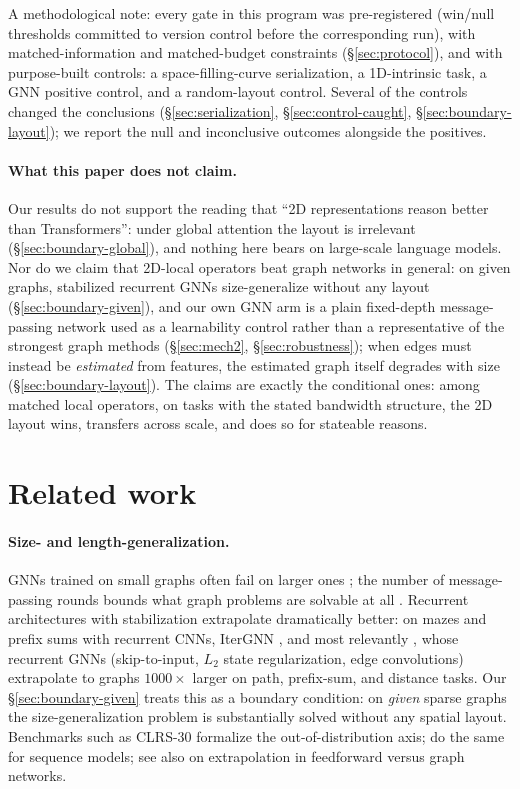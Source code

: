 \documentclass[11pt]{article}
\begin{document}
A methodological note: every gate in this program was pre-registered (win/null
thresholds committed to version control before the corresponding run), with
matched-information and matched-budget constraints (\S\ref{sec:protocol}), and
with purpose-built controls: a space-filling-curve serialization, a
1D-intrinsic task, a GNN positive control, and a random-layout control.
Several of the controls changed the conclusions
(\S\ref{sec:serialization}, \S\ref{sec:control-caught},
\S\ref{sec:boundary-layout}); we report the null and inconclusive outcomes
alongside the positives.

\paragraph{What this paper does not claim.} Our results do not support the
reading that ``2D representations reason better than Transformers'': under
global attention the layout is irrelevant (\S\ref{sec:boundary-global}), and
nothing here bears on large-scale language models. Nor do we claim that
2D-local operators beat graph networks in general: on given graphs,
stabilized recurrent GNNs size-generalize without any layout
(\S\ref{sec:boundary-given}), and our own GNN arm is a plain fixed-depth
message-passing network used as a learnability control rather than a
representative of the strongest graph methods (\S\ref{sec:mech2},
\S\ref{sec:robustness});
when edges must instead be \emph{estimated} from features, the estimated
graph itself degrades with size (\S\ref{sec:boundary-layout}). The claims are
exactly the conditional ones: among matched local operators, on tasks with
the stated bandwidth structure, the 2D layout wins, transfers across scale,
and does so for stateable reasons.

\section{Related work}\label{sec:related}

\paragraph{Size- and length-generalization.} GNNs trained on small graphs
often fail on larger ones \citep{yehudai2021local}; the number of
message-passing rounds bounds what graph problems are solvable at all
\citep{loukas2020depth}. Recurrent architectures with stabilization
extrapolate dramatically better: \citet{schwarzschild2021canyou} on mazes and
prefix sums with recurrent CNNs, IterGNN \citep{tang2020itergnn}, and most
relevantly \citet{groetschla2022recurrent}, whose recurrent GNNs
(skip-to-input, $L_2$ state regularization, edge convolutions) extrapolate to
graphs $1000\times$ larger on path, prefix-sum, and distance tasks. Our
\S\ref{sec:boundary-given} treats this as a boundary condition: on
\emph{given} sparse graphs the size-generalization problem is substantially
solved without any spatial layout. Benchmarks such as CLRS-30
\citep{velickovic2022clrs} formalize the out-of-distribution axis;
\citet{deletang2023chomsky} do the same for sequence models; see also
\citet{xu2021extrapolate} on extrapolation in feedforward versus graph
networks.
\end{document}
